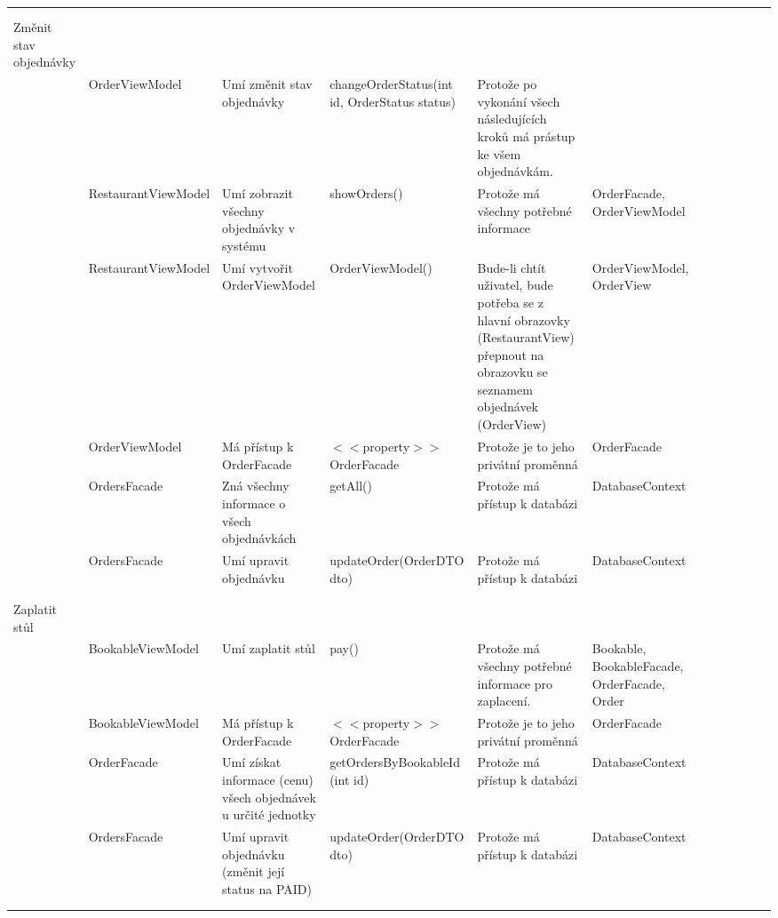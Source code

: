 \begin{landscape}
\begin{longtable}{ Lp{3cm} | Lp{3.5cm} | Lp{4.5cm} | Lp{4cm} | Lp{4.5cm} | Lp{4cm} }
    & & & & & \\
    & & & & & \\
    
    Změnit stav objednávky & & & & & \\
    \hline
    & OrderViewModel & Umí změnit stav objednávky & changeOrderStatus(int id, OrderStatus status) & Protože po vykonání všech následujících kroků má prástup ke všem objednávkám. & \\
    & RestaurantViewModel & Umí zobrazit všechny objednávky v systému & showOrders() & Protože má všechny potřebné informace & OrderFacade, OrderViewModel \\
    & RestaurantViewModel & Umí vytvořit OrderViewModel & OrderViewModel() & Bude-li chtít uživatel, bude potřeba se z hlavní obrazovky (RestaurantView) přepnout na obrazovku se seznamem objednávek (OrderView) & OrderViewModel, OrderView \\
    & OrderViewModel & Má přístup k OrderFacade & $<<$property$>>$ OrderFacade & Protože je to jeho privátní proměnná & OrderFacade \\
    & OrdersFacade & Zná všechny informace o všech objednávkách & getAll() & Protože má přístup k databázi & DatabaseContext\\
    & OrdersFacade & Umí upravit objednávku & updateOrder(OrderDTO dto) & Protože má přístup k databázi & DatabaseContext\\
    & & & & & \\
    & & & & & \\
    
    Zaplatit stůl & & & & & \\
    \hline
    & BookableViewModel & Umí zaplatit stůl & pay() & Protože má všechny potřebné informace pro zaplacení. & Bookable, BookableFacade, OrderFacade, Order \\
    & BookableViewModel & Má přístup k OrderFacade & $<<$property$>>$ OrderFacade & Protože je to jeho privátní proměnná & OrderFacade \\
    & OrderFacade & Umí získat informace (cenu) všech objednávek u určité jednotky & getOrdersByBookableId (int id) & Protože má přístup k databázi & DatabaseContext \\
    & OrdersFacade & Umí upravit objednávku (změnit její status na PAID) & updateOrder(OrderDTO dto) & Protože má přístup k databázi & DatabaseContext\\
    & & & & & \\
    & & & & & \\
    

\end{longtable}
\end{landscape}
